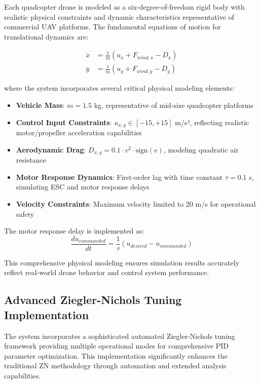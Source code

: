 Each quadcopter drone is modeled as a six-degree-of-freedom rigid body with realistic physical constraints and dynamic characteristics representative of commercial UAV platforms. The fundamental equations of motion for translational dynamics are:

\begin{align}
\ddot{x} &= \frac{1}{m}(u_x + F_{wind,x} - D_x) \\
\ddot{y} &= \frac{1}{m}(u_y + F_{wind,y} - D_y)
\end{align}

where the system incorporates several critical physical modeling elements:

\begin{itemize}
    \item \textbf{Vehicle Mass}: $m = 1.5$ kg, representative of mid-size quadcopter platforms
    \item \textbf{Control Input Constraints}: $u_{x,y} \in [-15, +15]$ m/s², reflecting realistic motor/propeller acceleration capabilities
    \item \textbf{Aerodynamic Drag}: $D_{x,y} = 0.1 \cdot v^2 \cdot \text{sign}(v)$, modeling quadratic air resistance
    \item \textbf{Motor Response Dynamics}: First-order lag with time constant $\tau = 0.1$ s, simulating ESC and motor response delays
    \item \textbf{Velocity Constraints}: Maximum velocity limited to 20 m/s for operational safety
\end{itemize}

The motor response delay is implemented as:
\begin{equation}
\frac{d u_{commanded}}{dt} = \frac{1}{\tau}(u_{desired} - u_{commanded})
\end{equation}

This comprehensive physical modeling ensures simulation results accurately reflect real-world drone behavior and control system performance.

\subsection*{Advanced Ziegler-Nichols Tuning Implementation}

The system incorporates a sophisticated automated Ziegler-Nichols tuning framework providing multiple operational modes for comprehensive PID parameter optimization. This implementation significantly enhances the traditional ZN methodology through automation and extended analysis capabilities.

